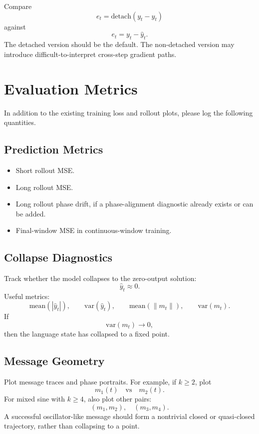 \documentclass[11pt]{article}
\begin{document}
Compare
\[
e_t = \mathrm{detach}(y_t - \hat y_t)
\]
against
\[
e_t = y_t - \hat y_t.
\]
The detached version should be the default. The non-detached version may introduce difficult-to-interpret cross-step gradient paths.

\section{Evaluation Metrics}

In addition to the existing training loss and rollout plots, please log the following quantities.

\subsection{Prediction Metrics}

\begin{itemize}[leftmargin=2em]
    \item Short rollout MSE.
    \item Long rollout MSE.
    \item Long rollout phase drift, if a phase-alignment diagnostic already exists or can be added.
    \item Final-window MSE in continuous-window training.
\end{itemize}

\subsection{Collapse Diagnostics}

Track whether the model collapses to the zero-output solution:
\[
\hat y_t \approx 0.
\]
Useful metrics:
\[
\mathrm{mean}(|\hat y_t|),
\qquad
\mathrm{var}(\hat y_t),
\qquad
\mathrm{mean}(\|m_t\|),
\qquad
\mathrm{var}(m_t).
\]
If
\[
\mathrm{var}(m_t) \to 0,
\]
then the language state has collapsed to a fixed point.

\subsection{Message Geometry}

Plot message traces and phase portraits. For example, if $k\geq 2$, plot
\[
m_1(t) \quad\text{vs}\quad m_2(t).
\]
For mixed sine with $k\geq 4$, also plot other pairs:
\[
(m_1,m_2),\quad (m_3,m_4).
\]
A successful oscillator-like message should form a nontrivial closed or quasi-closed trajectory, rather than collapsing to a point.
\end{document}
